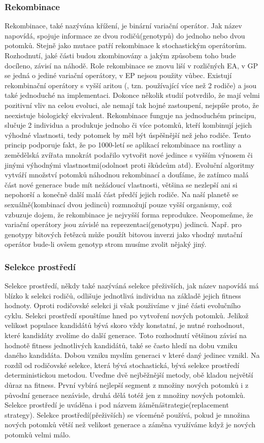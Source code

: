 \subsubsection{Rekombinace}
Rekombinace, také nazývána křížení, je binární variační operátor. Jak název napovídá, spojuje informace ze dvou rodičů(genotypů) do jednoho nebo dvou potomků. Stejně jako mutace patří rekombinace k stochastickým operátorům. Rozhodnutí, jaké části budou zkombinovány a jakým způsobem toho bude docíleno, závisí na náhodě. Role rekombinace se znovu liší v rozličných EA, v GP se jedná o jediné variační operátory, v EP nejsou použity vůbec. Existují  rekombinační operátory s vyšší aritou (, tzn.  používající více než 2 rodiče) a jsou také jednoduché na implementaci. Dokonce několik studií potvrdilo, že mají velmi pozitivní vliv na celou evoluci, ale nemají tak hojné zastoupení, nejspíše proto, že neexistuje biologický ekvivalent. Rekombinace funguje na jednoduchém principu, slučuje 2 individua a produkuje jednoho či více potomků, kteří kombinují jejich výhodné vlastnosti, tedy potomek by měl být úspěšnější než jeho rodiče. Tento princip podporuje fakt, že po 1000-letí se aplikací rekombinace na rostliny a zemědělská zvířata mnokrát podařilo vytvořit nové jedince s vyšším výnosem či jinými výhodnými vlastnostmi(odolnost proti škůdcům atd). Evoluční algoritmy vytváří množství potomků náhodnou rekombinací a doufáme, že zatímco malá část nové generace bude mít nežádoucí vlastnosti, většina se nezlepší ani si nepohorší a konečně další malá část předčí jejich rodiče. Na naší planetě se sexuálně(kombinací dvou jedinců) rozmnožují pouze vyšší organismy, což vzbuzuje dojem, že rekombinace je nejvyšší forma reprodukce. Neopomeňme, že  variační operátory jsou závislé na reprezentaci(genotypu) jedinců. Např. pro genotypy bitových řetězců může použít bitovou inverzi jako vhodný mutační operátor bude-li ovšem genotyp strom musíme zvolit nějaký jiný. 
\subsubsection{Selekce prostředí}
Selekce prostředí, někdy také nazýváná selekce přeživších, jak název napovídá má blízko k selekci rodičů, odlišuje jednotlivá individua na základě jejich fitness hodnoty. Oproti rodičovské selekci ji však použiváme v jiné části evolučního cyklu. Selekci prostředí spouštíme hned po vytvoření nových potomků. Jelikož velikost populace kandidátů bývá skoro vždy konstatní, je nutné rozhodnout, které kandidáty zvolíme do další generace. Toto rozhodnutí většinou závisí na hodnotě fitness jednotlivých kandidátů, také se často hledí na dobu vzniku daného kandidáta. Dobou vzniku myslím generaci v které daný jedinec vznikl. Na rozdíl od rodičovské selekce, která bývá stochastická, bývá selekce prostředí deterministickou metodou. Uveďme dvě nejběžnější metody, obě kladou největší důraz na fitness. První vybírá nejlepší segment z množiny nových potomků i z původní generace nezávisle, druhá dělá totéž jen z množiny nových potomků. Selekce prostředí je uváděna i pod názvem \"záměná\" strategie(replacement strategy). Selekce prostředí(přeživších) se víceméně používá, pokud je množina nových potomků větší než velikost generace a záměna využíváme když je nových potomků velmi málo.
